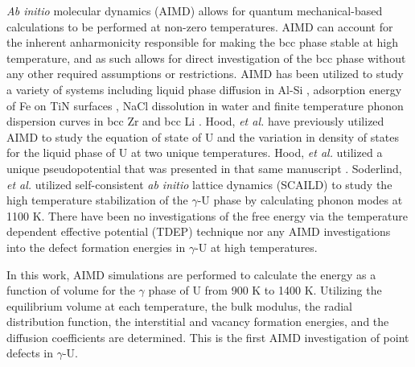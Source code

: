 \documentclass[review]{elsarticle}
\begin{document}
\textit{Ab initio} molecular dynamics (AIMD) allows for quantum mechanical-based calculations to be performed at non-zero temperatures. AIMD can account for the inherent anharmonicity responsible for making the bcc phase stable at high temperature, and as such allows for direct investigation of the bcc phase without any other required assumptions or restrictions.  AIMD has been utilized to study a variety of systems including liquid phase diffusion in Al-Si \cite{manga2018}, adsorption energy of Fe on TiN surfaces \cite{wang2010}, NaCl dissolution in water \cite{timko2010} and finite temperature phonon dispersion curves in bcc Zr and bcc Li \cite{hellman2011}. Hood, \textit{et al.} \cite{hood2008} have previously utilized AIMD to study the equation of state of U and the variation in density of states for the liquid phase of U at two unique temperatures. Hood, \textit{et al.} utilized a unique pseudopotential that was presented in that same manuscript \cite{hood2008}. Soderlind, \textit{et al.} \cite{soderlind2012} utilized self-consistent \textit{ab initio} lattice dynamics (SCAILD) to study the high temperature stabilization of the $\gamma$-U phase by calculating phonon modes at 1100 K. There have been no investigations of the free energy via the temperature dependent effective potential (TDEP) technique \cite{hellman2013} nor any AIMD investigations into the defect formation energies in $\gamma$-U at high temperatures. 

In this work, AIMD simulations are performed to calculate the energy as a function of volume for the $\gamma$ phase of U from 900 K to 1400 K. Utilizing the equilibrium volume at each temperature, the bulk modulus, the radial distribution function, the interstitial and vacancy formation energies, and the diffusion coefficients are determined. This is the first AIMD investigation of point defects in $\gamma$-U. 
\end{document}
